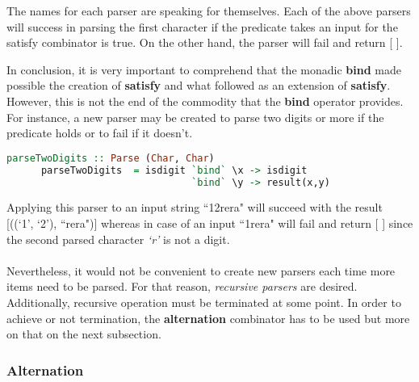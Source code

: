 \documentclass[a4paper, onecolumn]{article}
\begin{document}
    The names for each parser are speaking for themselves. Each of the above parsers will success in parsing the first character if the predicate takes an input for the satisfy combinator is true. On the other hand, the parser will fail and return [ ]. 
    
    In conclusion, it is very important to comprehend that the monadic \textbf{bind} made possible the creation of \textbf{satisfy} and what followed as an extension of \textbf{satisfy}. However, this is not the end of the commodity that the \textbf{bind} operator provides. For instance, a new parser may be created to parse two digits or more if the predicate holds or to fail if it doesn't. 
    
    \begin{tcolorbox}
    \begin{lstlisting}[language=Haskell]
      parseTwoDigits :: Parse (Char, Char)
      parseTwoDigits  = isdigit `bind` \x -> isdigit 
                                `bind` \y -> result(x,y)
    \end{lstlisting}
    \end{tcolorbox}
    
    Applying this parser to an input string ``12rera" will succeed with the result [((`1', `2'), ``rera")] whereas in case of an input ``1rera" will fail and return [ ] since the second parsed character \textit{`r'} is not a digit. \\ \\
    Nevertheless, it would not be convenient to create new parsers each time more items need to be parsed. For that reason, \textit{recursive parsers} are desired. Additionally, recursive operation must be terminated at some point. In order to achieve or not termination, the \textbf{alternation} combinator has to be used but more on that on the next subsection.
    \subsubsection{Alternation}
    
\end{document}
